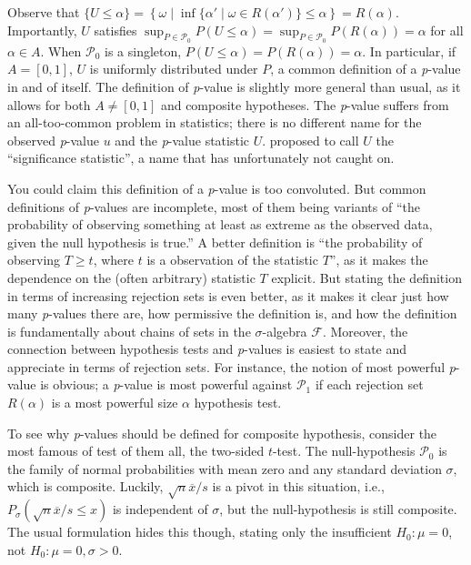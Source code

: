 Observe that $\{U\leq\alpha\}=\left\{ \omega\mid\inf\{\alpha'\mid\omega\in R(\alpha')\}\leq\alpha\right\}=R(\alpha)$.
Importantly, $U$ satisfies $\sup_{P\in\mathcal{P}_{0}}P(U\leq\alpha)=\sup_{P\in\mathcal{P}_{0}}P(R(\alpha))=\alpha$
for all $\alpha\in A$. When $\mathcal{P}_{0}$ is a singleton, $P(U\leq\alpha)=P(R(\alpha))=\alpha$.
In particular, if $A=[0,1]$, $U$ is uniformly distributed under
$P$, a common definition of a \emph{p}-value in and of itself. The definition
of \emph{p}-value is slightly more general than usual, as it allows
for both $A\neq[0,1]$ and composite hypotheses. The \emph{p}-value
suffers from an all-too-common problem in statistics; there is no
different name for the observed \emph{p}-value $u$ and the \emph{p}-value
statistic $U$. \textcite{Schweder1988-nh} proposed to call $U$ the
``significance statistic'', a name that has unfortunately not caught
on. 

You could claim this definition of a \emph{p}-value is too convoluted. But common definitions of\emph{ p}-values are incomplete, most of them being variants of ``the probability of observing something at least as extreme as the observed data, given the null hypothesis is true.'' A better definition is ``the probability of observing $T\geq t$, where $t$ is a observation of the statistic $T$'', as it makes the dependence on the (often arbitrary) statistic $T$ explicit. But stating the definition in terms of increasing rejection sets is even better, as it makes it clear just how many \emph{p}-values there are, how permissive the definition is, and how the definition is fundamentally about chains of sets in the $\sigma$-algebra $\mathcal{F}$. Moreover, the connection between hypothesis tests and \emph{p}-values is easiest to state and appreciate in terms of rejection sets. For instance, the notion of most powerful \emph{p}-value is obvious; a \emph{p}-value is most powerful against $\mathcal{P}_{1}$ if each rejection set $R(\alpha)$ is a most powerful size $\alpha$ hypothesis test. 

To see why \emph{p}-values should be defined for composite hypothesis, consider the most famous of test of them all, the two-sided $t$-test. The null-hypothesis $\mathcal{P}_{0}$ is the family of normal probabilities with mean zero and any standard deviation $\sigma$, which is composite. Luckily, $\sqrt{n}\overline{x}/s$ is a pivot in this situation, i.e., $P_{\sigma}(\sqrt{n}\overline{x}/s\leq x)$ is independent of $\sigma$, but the null-hypothesis is still composite. The usual formulation hides this though, stating only the insufficient $H_0:\mu = 0$, not $H_0:\mu=0,\sigma>0$.

